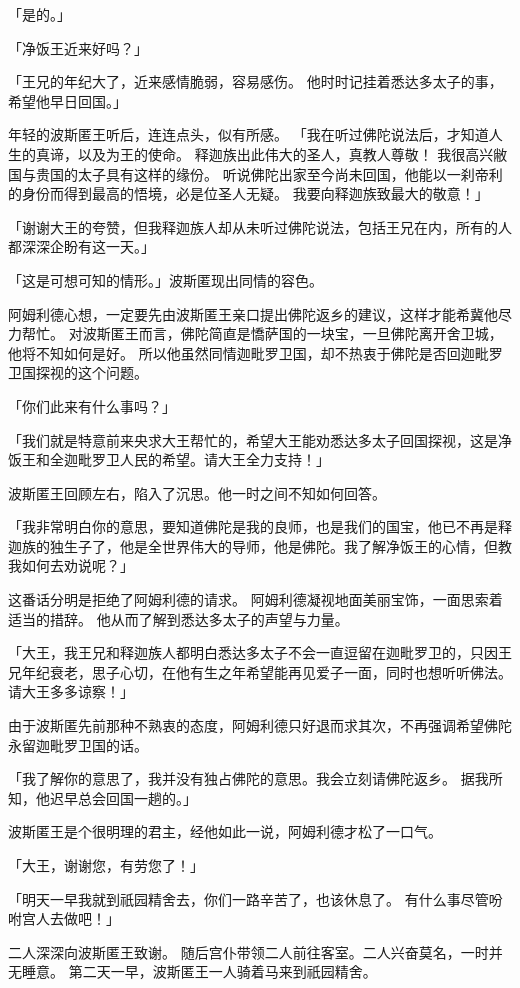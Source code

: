 \documentclass[twoside,openany]{book}
\begin{document}
「是的。」

「净饭王近来好吗？」

「王兄的年纪大了，近来感情脆弱，容易感伤。
他时时记挂着悉达多太子的事，希望他早日回国。」

年轻的波斯匿王听后，连连点头，似有所感。
「我在听过佛陀说法后，才知道人生的真谛，以及为王的使命。
释迦族出此伟大的圣人，真教人尊敬！
我很高兴敝国与贵国的太子具有这样的缘份。
听说佛陀出家至今尚未回国，他能以一刹帝利的身份而得到最高的悟境，必是位圣人无疑。
我要向释迦族致最大的敬意！」

「谢谢大王的夸赞，但我释迦族人却从未听过佛陀说法，包括王兄在内，所有的人都深深企盼有这一天。」

「这是可想可知的情形。」波斯匿现出同情的容色。

阿姆利德心想，一定要先由波斯匿王亲口提出佛陀返乡的建议，这样才能希冀他尽力帮忙。
对波斯匿王而言，佛陀简直是憍萨国的一块宝，一旦佛陀离开舍卫城，他将不知如何是好。
所以他虽然同情迦毗罗卫国，却不热衷于佛陀是否回迦毗罗卫国探视的这个问题。

「你们此来有什么事吗？」

「我们就是特意前来央求大王帮忙的，希望大王能劝悉达多太子回国探视，这是净饭王和全迦毗罗卫人民的希望。请大王全力支持！」

波斯匿王回顾左右，陷入了沉思。他一时之间不知如何回答。

「我非常明白你的意思，要知道佛陀是我的良师，也是我们的国宝，他已不再是释迦族的独生子了，他是全世界伟大的导师，他是佛陀。我了解净饭王的心情，但教我如何去劝说呢？」

这番话分明是拒绝了阿姆利德的请求。
阿姆利德凝视地面美丽宝饰，一面思索着适当的措辞。
他从而了解到悉达多太子的声望与力量。

「大王，我王兄和释迦族人都明白悉达多太子不会一直逗留在迦毗罗卫的，只因王兄年纪衰老，思子心切，在他有生之年希望能再见爱子一面，同时也想听听佛法。请大王多多谅察！」

由于波斯匿先前那种不熟衷的态度，阿姆利德只好退而求其次，不再强调希望佛陀永留迦毗罗卫国的话。

「我了解你的意思了，我并没有独占佛陀的意思。我会立刻请佛陀返乡。
据我所知，他迟早总会回国一趟的。」

波斯匿王是个很明理的君主，经他如此一说，阿姆利德才松了一口气。

「大王，谢谢您，有劳您了！」

「明天一早我就到祇园精舍去，你们一路辛苦了，也该休息了。
有什么事尽管吩咐宫人去做吧！」

二人深深向波斯匿王致谢。
随后宫仆带领二人前往客室。二人兴奋莫名，一时并无睡意。
第二天一早，波斯匿王一人骑着马来到祇园精舍。
\end{document}
